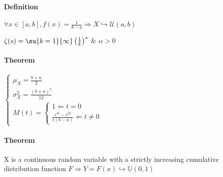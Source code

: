 \paragraph{Definition}
\begin{center}
	$\forall x\in [a,b], f(x)= \frac{1}{b-a}\Rightarrow X\hookrightarrow\mathcal{U}(a,b)$
\end{center}
$\zeta(s)=\su{k=1}{\infty}\left( \frac{1}{k} \right)^{s}$ \& $\alpha > 0$
\paragraph{Theorem}
\begin{center}
$\begin{cases}
	\mu_{X}=\frac{b+a}{2}\\
	\sigma_{X}^{2} = \frac{(b+a)^{2}}{12}\\
	M(t)=\begin{cases}1\Leftarrow t=0 \\\frac{e^{tb}-e^{ta}}{t(b-a)}\Leftarrow t\neq 0\end{cases}
\end{cases}$
\end{center}
\paragraph{Theorem}
X is a continuous random variable with a strictly increasing cumulative 
distribution function $F\Rightarrow Y=F(x)\hookrightarrow\mathbb{U}(0,1)$
